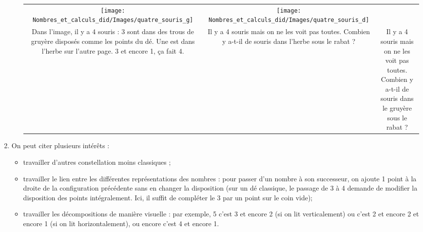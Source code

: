 \begin{enumerate}
\begin{itemize}
\begin{tabular}{C{5}C{5}C{5}}
         \texttt{[image: Nombres\_et\_calculs\_did/Images/quatre\_souris\_g]}
         &
         \texttt{[image: Nombres\_et\_calculs\_did/Images/quatre\_souris\_d]} \\
         Dans l'image, il y a 4 souris : 3 sont dans des trous de gruyère disposés comme les points du dé. Une est dans l'herbe sur l'autre page. 3 et encore 1, ça fait 4.
         &
         Il y a 4 souris mais on ne les voit pas toutes. \newline
         Combien y a-t-il de souris dans l'herbe sous le rabat ?
         &
         Il y a 4 souris mais on ne les voit pas toutes. \newline
         Combien y a-t-il de souris dans le gruyère sous le rabat ? \\
      \end{tabular}
   \end{itemize}
   \bigskip
   \item On peut citer plusieurs intérêts :
   \begin{itemize}
      \item travailler d'autres constellation moins classiques ;
      \item travailler le lien entre les différentes représentations des nombres : pour passer d'un nombre à son successeur, on ajoute 1 point à la droite de la configuration précédente sans en changer la disposition (sur un dé classique, le passage de 3 à 4 demande de modifier la disposition des points intégralement. Ici, il suffit de compléter le 3 par un point sur le coin vide);
      \item travailler les décompositions de manière visuelle : par exemple, 5 c'est 3 et encore 2 (si on lit verticalement) ou c'est 2 et encore 2 et encore 1 (si on lit horizontalement), ou encore c'est 4 et encore 1.
   \end{itemize}
\end{enumerate}
